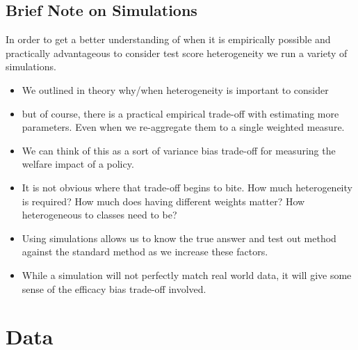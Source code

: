 \documentclass{article}
\theoremstyle{definition}
\theoremstyle{definition}
\theoremstyle{definition}
\theoremstyle{definition}
\begin{document}
    \subsection{Brief Note on Simulations }
        In order to get a better understanding of when it is empirically possible and practically advantageous to consider test score heterogeneity we run a variety of simulations. 
        \begin{itemize}
            \item We outlined in theory why/when heterogeneity is important to consider
            \item but of course, there is a practical empirical trade-off with estimating more parameters. Even when we re-aggregate them to a single weighted measure. 
            \item We can think of this as a sort of variance bias trade-off for measuring the welfare impact of a policy. 
            \item It is not obvious where that trade-off begins to bite. How much heterogeneity is required? How much does having different weights matter? How heterogeneous to classes need to be? 
            \item Using simulations allows us to know the true answer and test out method against the standard method as we increase these factors. 
            \item While a simulation will not perfectly match real world data, it will give some sense of the efficacy bias trade-off involved. 
            
        \end{itemize}
        
        

\section{Data}
\end{document}
